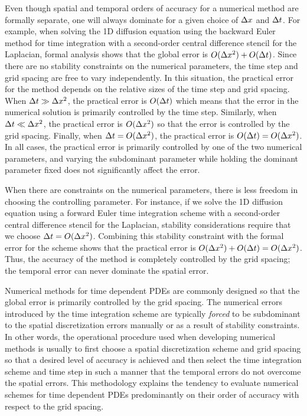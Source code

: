 \documentclass[oneeqnum,onefignum,onetabnum,onethmnum]{siamltex}
\begin{document}
Even though spatial and temporal orders of accuracy for a numerical method
are formally separate, one will always dominate for a given choice of 
$\Delta x$ and $\Delta t$.  For example, when solving the 1D diffusion equation 
using the backward Euler method for time integration with a second-order 
central difference stencil for the Laplacian, formal analysis shows that 
the global error is $O(\Delta x^2) + O(\Delta t)$.  Since there are no 
stability constraints on the numerical parameters, the time
step and grid spacing are free to vary independently.  In this situation, the 
practical error for the method depends on the relative sizes of the time step 
and grid spacing.  When $\Delta t \gg \Delta x^2$, the practical error is 
$O(\Delta t)$ which means that the error in the numerical solution is 
primarily controlled by the time step.  Similarly, when 
$\Delta t \ll \Delta x^2$, the practical error is $O(\Delta x^2)$ so that 
the error is controlled by the grid spacing.  Finally, when 
$\Delta t  = O(\Delta x^2)$, the practical error is 
$O(\Delta t) = O(\Delta x^2)$.  In all cases, the practical error is 
primarily controlled by one of the two numerical parameters, and varying
the subdominant parameter while holding the dominant parameter fixed does 
not significantly affect the error.
 
When there are constraints on the numerical parameters, there is less freedom 
in choosing the controlling parameter.  For instance, if we solve the 
1D diffusion equation using a forward Euler time integration scheme with a 
second-order central difference stencil for the Laplacian, stability
considerations require that we choose $\Delta t = O(\Delta x^2)$.  
Combining this stability constraint with the formal error for the scheme
shows that the practical error is 
$O(\Delta x^2) + O(\Delta t) = O(\Delta x^2)$.  Thus, the accuracy of the 
method is completely controlled by the grid spacing; the temporal error can 
never dominate the spatial error.

Numerical methods for time dependent PDEs are commonly designed so that 
the global error is primarily controlled by the grid spacing.  The numerical
errors introduced by the time integration scheme are typically \emph{forced}
to be subdominant to the spatial discretization errors manually or as a result
of stability constraints.  In other words, the operational procedure used 
when developing numerical methods is usually to first choose a spatial 
discretization scheme and grid spacing so that a desired level of accuracy 
is achieved and then select the time integration scheme and time step in 
such a manner that the temporal errors do not overcome the spatial errors.  
This methodology explains the tendency to evaluate numerical schemes for
time dependent PDEs predominantly on their order of accuracy with respect 
to the grid spacing.
\end{document}
